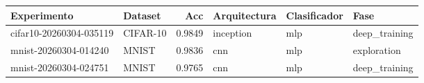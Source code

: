 \begin{tabular}{llrlll}
\toprule
Experimento & Dataset & Acc & Arquitectura & Clasificador & Fase \\
\midrule
cifar10-20260304-035119 & CIFAR-10 & 0.9849 & inception & mlp & deep_training \\
mnist-20260304-014240 & MNIST & 0.9836 & cnn & mlp & exploration \\
mnist-20260304-024751 & MNIST & 0.9765 & cnn & mlp & deep_training \\
\bottomrule
\end{tabular}